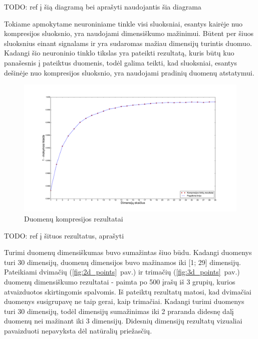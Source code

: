 \documentclass{VUMIFPSbakalaurinis}
\newcommand{\TODO}[1]{
\colorbox{todo-background-color}{TODO: #1}
}
\begin{document}
\TODO{ref į šią diagramą bei aprašyti naudojantis šia diagrama}

Tokiame apmokytame neuroniniame tinkle visi sluoksniai, esantys kairėje nuo kompresijos sluoksnio, yra naudojami dimensiškumo mažinimui.
Būtent per šiuos sluoksnius einant signalams ir yra sudaromas mažiau dimensijų turintis duomuo.
Kadangi šio neuroninio tinklo tikslas yra pateikti rezultatą, kuris būtų kuo panašesnis į pateiktus duomenis, todėl galima teikti, kad sluoksniai, esantys dešinėje nuo kompresijos sluoksnio, yra naudojami pradinių duomenų atstatymui.

\begin{figure}
	\includegraphics[scale=0.25]{pics/compression_dimensions}
	\caption{Duomenų kompresijos rezultatai}
	\label{fig:compression_dimensions}
\end{figure}

\TODO{ref į šituos rezultatus, aprašyti}

Turimi duomenų dimensiškumas buvo sumažintas šiuo būdu.
Kadangi duomenys turi 30 dimensijų, duomenų dimensijos buvo mažinamos iki [1; 29] dimensijų.
Pateikiami dvimačių (\ref{fig:2d_points}~pav.) ir trimačių (\ref{fig:3d_points}~pav.) duomenų dimensiškumo rezultatai - paimta po 500 įrašų iš 3 grupių, kurios atvaizduotos skirtingomis spalvomis.
Iš pateiktų rezultatų matosi, kad dvimačiai duomenys susigrupavę ne taip gerai, kaip trimačiai.
Kadangi turimi duomenys turi 30 dimensijų, todėl dimensijų sumažinimas iki 2 praranda didesnę dalį duomenų nei mažinant iki 3 dimensijų.
Didesnių dimensijų rezultatų vizualiai pavaizduoti nepavyksta dėl natūralių priežasčių.
\end{document}
